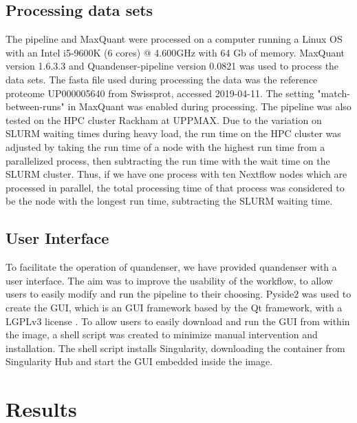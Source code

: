 \documentclass[11pt]{article}
\begin{document}
\subsection*{Processing data sets}
The pipeline and MaxQuant were processed on a computer running a Linux OS with an Intel i5-9600K (6 cores) @ 4.600GHz with 64 Gb of memory. MaxQuant version 1.6.3.3 and Quandenser-pipeline version 0.0821 was used to process the data sets. The fasta file used during processing the data was the reference proteome UP000005640 from Swissprot, accessed 2019-04-11. The setting "match-between-runs" in MaxQuant was enabled during processing. The pipeline was also tested on the HPC cluster Rackham at UPPMAX. Due to the variation on SLURM waiting times during heavy load, the run time on the HPC cluster was adjusted by taking the run time of a node with the highest run time from a parallelized process, then subtracting the run time with the wait time on the SLURM cluster. Thus, if we have one process with ten Nextflow nodes which are processed in parallel, the total processing time of that process was considered to be the node with the longest run time, subtracting the SLURM waiting time.


\subsection*{User Interface}
To facilitate the operation of quandenser, we have provided quandenser with a user interface. The aim was to improve the usability of the workflow, to allow users to easily modify and run the pipeline to their choosing. Pyside2 was used to create the GUI, which is an GUI framework based by the Qt framework, with a LGPLv3 license \cite{pyside2}. To allow users to easily download and run the GUI from within the image, a shell script was created to minimize manual intervention and installation. The shell script installs Singularity, downloading the container from Singularity Hub and start the GUI embedded inside the image.

\section*{Results}
\end{document}
